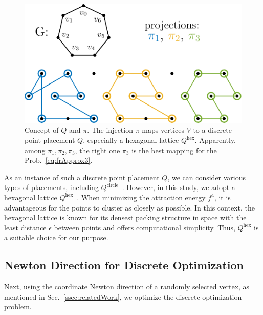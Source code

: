 \documentclass[dvipdfmx,10pt,journal,compsoc]{IEEEtran}
\begin{document}
\begin{figure}[t]
  \centering
  \includegraphics[width=\columnwidth]{pi/pi.pdf}
  \caption{
    Concept of $Q$ and $\pi$.
    The injection $\pi$ maps vertices $V$ to a discrete point placement $Q$, especially a hexagonal lattice $Q^\mathrm{hex}$.
    Apparently, among $\pi_1, \pi_2, \pi_3$, the right one $\pi_3$ is the best mapping for the Prob.~\eqref{eq:frApprox3}.
  }
  \label{fig:pi}
\end{figure}

As an instance of such a discrete point placement $Q$, we can consider various types of placements, including $Q^\mathrm{circle}$~\cite{ghassemitoosiSimulatedAnnealingPreProcessing2016}.
However, in this study, we adopt a hexagonal lattice $Q^\mathrm{hex}$~\cite{patelHexagonalGrids2013,s22145179}.
When minimizing the attraction energy $f^\mathrm{a}$, it is advantageous for the points to cluster as closely as possible. In this context, the hexagonal lattice is known for its densest packing structure in space with the least distance $\epsilon$ between points and offers computational simplicity. Thus, $Q^\mathrm{hex}$ is a suitable choice for our purpose.

\subsection{Newton Direction for Discrete Optimization}\label{ssec:newtonDirection}

Next, using the coordinate Newton direction of a randomly selected vertex, as mentioned in Sec.~\ref{ssec:relatedWork}, we optimize the discrete optimization problem.
\end{document}
